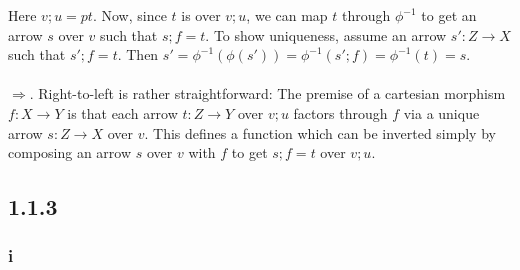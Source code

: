 \documentclass{article}
\begin{document}
 
Here $v;u = pt$. Now, since $t$ is over $v;u$, we can map $t$ through $\phi^{-1}$ to get an arrow
$s$ over $v$ such that $s;f = t$. To show uniqueness, assume an arrow $s' : Z \to X$ such that
$s';f = t$. Then $s' = \phi^{-1}(\phi(s')) = \phi^{-1}(s';f) = \phi^{-1}(t) = s$.
\\~\\
$\Rightarrow$. Right-to-left is rather straightforward: The premise of a cartesian morphism $f : X \to Y$ is that
each arrow $t : Z \to Y$ over $v;u$ factors through $f$ via a unique arrow $s : Z \to X$ over $v$. 
This defines a function which can be inverted simply by composing an arrow $s$ over $v$ with $f$ to get $s;f = t$ over $v;u$.

\subsection*{1.1.3}

\subsubsection*{i} 
\end{document}
